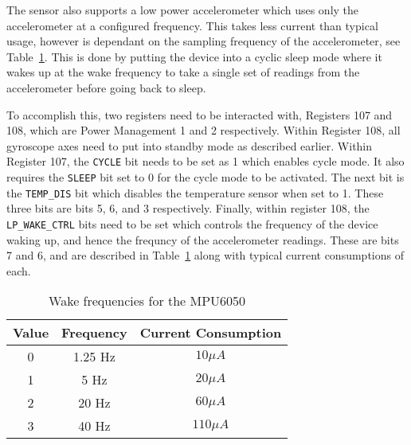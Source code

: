 The sensor also supports a low power accelerometer which uses only the accelerometer at a configured frequency. This takes less current than typical usage, however is dependant on the sampling frequency of the accelerometer, see Table~\ref{tab:sensor:wake}. This is done by putting the device into a cyclic sleep mode where it wakes up at the wake frequency to take a single set of readings from the accelerometer before going back to sleep. 

To accomplish this, two registers need to be interacted with, Registers 107 and 108, which are Power Management 1 and 2 respectively. Within Register 108, all gyroscope axes need to put into standby mode as described earlier. Within Register 107, the \verb|CYCLE| bit needs to be set as 1 which enables cycle mode. It also requires the \verb|SLEEP| bit set to 0 for the cycle mode to be activated. The next bit is the \verb|TEMP_DIS| bit which disables the temperature sensor when set to 1. These three bits are bits 5, 6, and 3 respectively. Finally, within register 108, the \verb|LP_WAKE_CTRL| bits need to be set which controls the frequency of the device waking up, and hence the frequncy of the accelerometer readings. These are bits 7 and 6, and are described in Table~\ref{tab:sensor:wake} along with typical current consumptions of each. 

\begin{table}
	\centering
	\begin{tabular}{|c|c|c|}
		\hline
		Value & Frequency & Current Consumption \\
		\hline
		0 & 1.25 Hz & $10\mu A$ \\
		1 & 5 Hz & $20\mu A$ \\
		2 & 20 Hz & $60\mu A$ \\
		3 & 40 Hz & $110\mu A$ \\
		\hline
	\end{tabular}
	\caption{Wake frequencies for the MPU6050}
	\label{tab:sensor:wake}
\end{table}